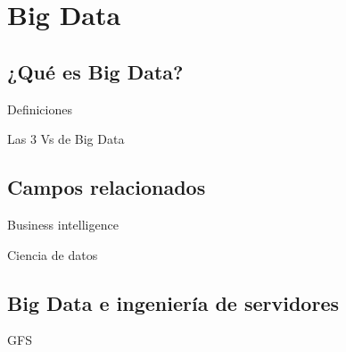 
\section{Big Data}

	\subsection*{¿Qué es Big Data?}

		\begin{frame}{Definiciones}
			
		\end{frame}

		\begin{frame}{Las 3 Vs de Big Data}
			
		\end{frame}

	
	\subsection*{Campos relacionados}

		\begin{frame}{Business intelligence}
			
			
		\end{frame}
		
		\begin{frame}{Ciencia de datos}
			
			
		\end{frame}
		

	\subsection*{Big Data e ingeniería de servidores}
	
		\begin{frame}{GFS}
			
			
		\end{frame}
